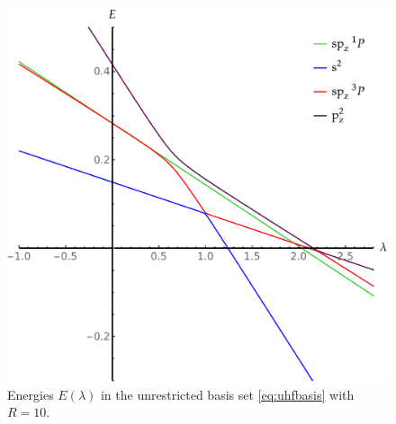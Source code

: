 \documentclass[11pt,a4paper]{article}
\begin{document}
\begin{figure}
    \centering
    \includegraphics[width=\linewidth]{EMP_UHF_R10.pdf}
    \caption{Energies $E(\lambda)$ in the unrestricted basis set \eqref{eq:uhfbasis} with $R=10$.}
    \label{fig:UHFMiniBas}
\end{figure}
\end{document}
